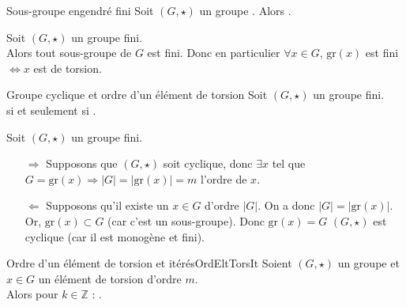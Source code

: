 \documentclass[12pt,a4paper]{report}
\begin{document}
    \begin{corollaire}{Sous-groupe engendré fini}{}
    Soit $(G, \star)$ un groupe . Alors .
    \end{corollaire}
    
    \begin{demo}
    Soit $(G, \star)$ un groupe fini.\\
    Alors tout sous-groupe de $G$ est fini. Donc en particulier $\forall x \in G$, $\text{gr}(x)$ est fini $\Leftrightarrow x$ est de torsion.
    \end{demo}
    
    \begin{proposition}{Groupe cyclique et ordre d'un élément de torsion}{}
    Soit $(G, \star)$ un groupe fini.\\
     si et seulement si .
    \end{proposition}
    
    \begin{demo}
    Soit $(G, \star)$ un groupe fini.
    \begin{itemize}
        \item[$\Rightarrow$] Supposons que $(G, \star)$ soit cyclique, donc $\exists x$ tel que $G = \text{gr}(x) \Rightarrow |G| = |\text{gr}(x)| = m$ l'ordre de $x$.
        \item[$\Leftarrow$] Supposons qu'il existe un $x \in G$ d'ordre $|G|$. On a donc $|G| = |\text{gr}(x)|$. Or, $\text{gr}(x) \subset G$ (car c'est un sous-groupe). Donc $\text{gr}(x) = G$ \ie $(G, \star)$ est cyclique (car il est monogène et fini).
    \end{itemize}
    \end{demo}
    
    \begin{proposition}{Ordre d'un élément de torsion et itérés}{OrdEltTorsIt}
    Soient $(G, \star)$ un groupe et $x \in G$ un élément de torsion d'ordre $m$.\\
    Alors pour $k \in \mathbb{Z}$ : .
    \end{proposition}
    
\end{document}
